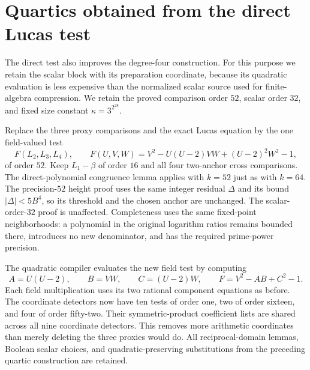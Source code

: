 \section{Quartics obtained from the direct Lucas test}
\label{sec:p3-quartics}

The direct test also improves the degree-four construction.
For this purpose we retain the scalar block with its preparation
coordinate, because its quadratic evaluation is less expensive
than the normalized scalar source used for finite-algebra
compression. We retain the proved comparison order $52$,
scalar order $32$, and fixed size constant
$\kappa=3^{2^{28}}$.

Replace the three proxy comparisons and the exact Lucas equation
by the one field-valued test
\[
 F(L_2,L_3,L_4),\qquad
 F(U,V,W)=V^2-U(U-2)VW+(U-2)^2W^2-1,
\]
of order $52$. Keep $L_1-\beta$ of order $16$ and all four
two-anchor cross comparisons. The direct-polynomial congruence
lemma applies with $k=52$ just as with $k=64$.
The precision-$52$ height proof uses the same integer residual
$\Delta$ and its bound $|\Delta|<5B^4$, so its threshold and
the chosen anchor are unchanged. The scalar-order-$32$ proof
is unaffected. Completeness uses the same fixed-point
neighborhoods: a polynomial in the original logarithm ratios
remains bounded there, introduces no new denominator, and
has the required prime-power precision.

The quadratic compiler evaluates the new field test by computing
\[
 A=U(U-2),\qquad B=VW,\qquad C=(U-2)W,
 \qquad F=V^2-AB+C^2-1.
\]
Each field multiplication uses its two rational component equations
as before. The coordinate detectors now have ten tests of order
one, two of order sixteen, and four of order fifty-two.
Their symmetric-product coefficient lists are shared across all
nine coordinate detectors. This removes more arithmetic
coordinates than merely deleting the three proxies would do.
All reciprocal-domain lemmas, Boolean scalar choices, and
quadratic-preserving substitutions from the preceding quartic
construction are retained.

